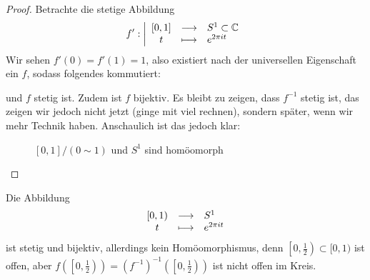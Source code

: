 \begin{proof}
    Betrachte die stetige Abbildung
        \begin{equation*}
        f': \left| \begin{array}{c c l} 
            [0,1] & \longrightarrow & S^1\subset \mathbb{C} \\
        t & \longmapsto &  e^{2\pi it}
        \end{array} \right.
    \end{equation*}
    Wir sehen $f'(0) = f'(1) = 1$, also existiert nach der universellen Eigenschaft ein  $f$, sodass folgendes kommutiert: \\
    und $f$ stetig ist. Zudem ist  $f$ bijektiv. Es bleibt zu zeigen, dass  $f^{-1}$ stetig ist, das zeigen wir jedoch nicht jetzt (ginge mit viel rechnen), sondern später, wenn wir mehr Technik haben. Anschaulich ist das jedoch klar:
\begin{figure}[ht]
    \centering
    \caption{$[0,1] / (0\sim 1)$ und $S^1$ sind homöomorph}
    \label{fig:intervall-und-kreis-sind-homeomorph}
\end{figure}
\end{proof}
\begin{remark}
    Die Abbildung
        \begin{equation*}
        \begin{array}{c c l} 
            [0,1) & \longrightarrow & S^1 \\
        t & \longmapsto &  e^{2\pi it}
        \end{array}
    \end{equation*}
    ist stetig und bijektiv, allerdings kein Homöomorphismus, denn $\left[ 0, \frac{1}{2} \right) \subset [0,1)$ ist offen, aber $f\left(\left[ 0,\frac{1}{2} \right)\right) = \left( f^{-1} \right) ^{-1}\left( \left[ 0,\frac{1}{2} \right)  \right) $ ist nicht offen im Kreis.
\end{remark}
